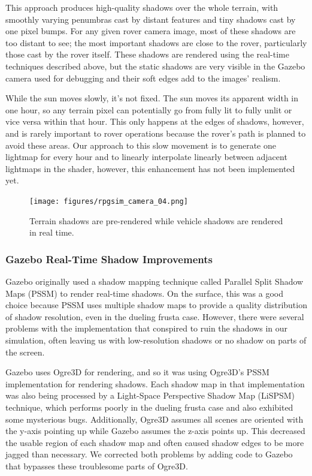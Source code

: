\documentclass[twocolumn,letterpaper]{IEEEAerospaceCLS}  %
\begin{document}
This approach produces high-quality shadows over the whole terrain, with smoothly varying penumbras cast by distant features and tiny shadows cast by one pixel bumps.  
For any given rover camera image, most of these shadows are too distant to see; the most important shadows are close to the rover, particularly those cast by the rover itself.
These shadows are rendered using the real-time techniques described above, but the static shadows are very visible in the Gazebo camera used for debugging and their soft edges add to the images' realism.

While the sun moves slowly, it's not fixed.  
The sun moves its apparent width in one hour, so any terrain pixel can potentially go from fully lit to fully unlit or vice versa within that hour.  
This only happens at the edges of shadows, however, and is rarely important to rover operations because the rover's path is planned to avoid these areas.  
Our approach to this slow movement is to generate one lightmap for every hour and to linearly interpolate linearly between adjacent lightmaps in the shader, however, this enhancement has not been implemented yet.

\begin{figure}[h!]
  \texttt{[image: figures/rpgsim\_camera\_04.png]}
  \caption{Terrain shadows are pre-rendered while vehicle shadows are rendered in real time.}
  \label{fig:baked_and_realtime_shadows}
\end{figure}

\subsubsection{Gazebo Real-Time Shadow Improvements}
Gazebo originally used a shadow mapping technique called Parallel Split Shadow Maps (PSSM) to render real-time shadows. 
On the surface, this was a good choice because PSSM uses multiple shadow maps to provide a quality distribution of shadow resolution, even in the dueling frusta case. 
However, there were several problems with the implementation that conspired to ruin the shadows in our simulation, often leaving us with low-resolution shadows or no shadow on parts of the screen.

Gazebo uses Ogre3D for rendering, and so it was using Ogre3D's PSSM implementation for rendering shadows. 
Each shadow map in that implementation was also being processed by a Light-Space Perspective Shadow Map (LiSPSM) technique, which performs poorly in the dueling frusta case and also exhibited some mysterious bugs. 
Additionally, Ogre3D assumes all scenes are oriented with the y-axis pointing up while Gazebo assumes the z-axis points up. 
This decreased the usable region of each shadow map and often caused shadow edges to be more jagged than necessary. 
We corrected both problems by adding code to Gazebo that bypasses these troublesome parts of Ogre3D.
\end{document}
